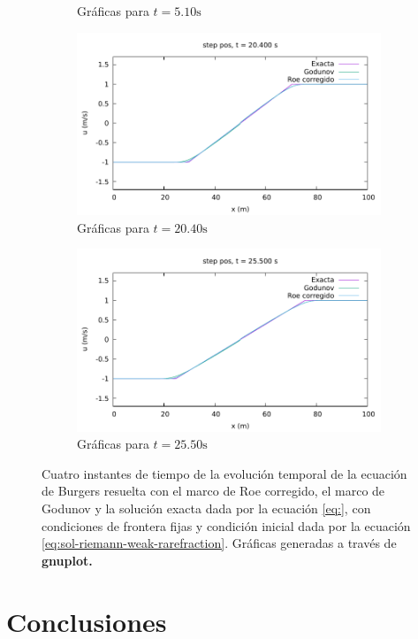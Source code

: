 \documentclass[12pt]{article}
\begin{document}
\begin{figure}[h]
\begin{subfigure}[b]{0.4\textwidth}
			\caption*{Gráficas para $t=5.10\unit{\second}$}
		\end{subfigure}
		\par\medskip
		\begin{subfigure}[b]{0.4\textwidth}
			\includegraphics[width=\textwidth]{../burgers1DVF/results/sol_fijas/step_pos-roe-fix/680.pdf}
			\caption*{Gráficas para $t=20.40\unit{\second}$}
		\end{subfigure}
		\hfill
		\begin{subfigure}[b]{0.4\textwidth}
			\includegraphics[width=\textwidth]{../burgers1DVF/results/sol_fijas/step_pos-roe-fix//850.pdf}
			\caption*{Gráficas para $t=25.50\unit{\second}$}
		\end{subfigure}
		\caption{Cuatro instantes de tiempo de la evolución temporal de la ecuación de Burgers resuelta con el marco de Roe corregido, el marco de Godunov y la solución exacta dada por la ecuación \ref{eq:}, con condiciones de frontera fijas y condición inicial dada por la ecuación \ref{eq:sol-riemann-weak-rarefraction}. Gráficas generadas a través de \textbf{gnuplot.}}
		\label{fig:step_pos-roe-fix}
	\end{figure}
		
	\section{Conclusiones}
	\printbibliography
	
\end{document}
